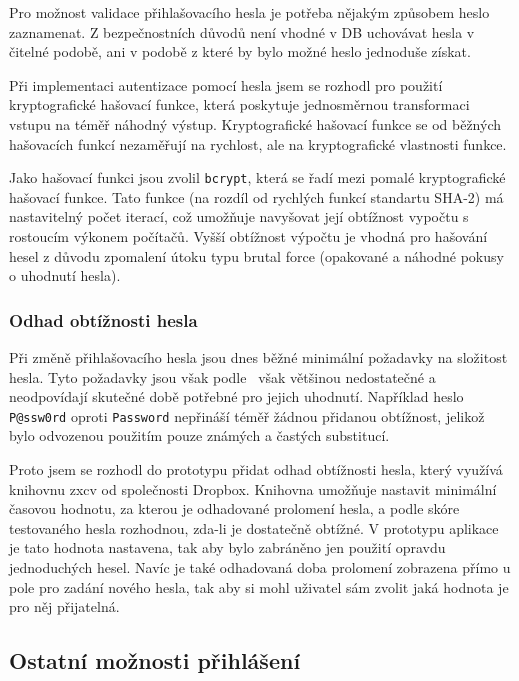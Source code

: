 Pro možnost validace přihlašovacího hesla je potřeba nějakým způsobem heslo zaznamenat.
Z bezpečnostních důvodů není vhodné v DB uchovávat hesla v čitelné podobě, ani v podobě z které by bylo možné heslo jednoduše získat.

Při implementaci autentizace pomocí hesla jsem se rozhodl pro použití kryptografické hašovací funkce, která poskytuje jednosměrnou transformaci vstupu na téměř náhodný výstup.
Kryptografické hašovací funkce se od běžných hašovacích funkcí nezaměřují na rychlost, ale na kryptografické vlastnosti funkce.

Jako hašovací funkci jsou zvolil \texttt{bcrypt}, která se řadí mezi pomalé kryptografické hašovací funkce.
Tato funkce (na rozdíl od rychlých funkcí standartu SHA-2) má nastavitelný počet iterací, což umožňuje navyšovat její obtížnost vypočtu s rostoucím výkonem počítačů.
Vyšší obtížnost výpočtu je vhodná pro hašování hesel z důvodu zpomalení útoku typu brutal force (opakované a náhodné pokusy o uhodnutí hesla).

\subsubsection{Odhad obtížnosti hesla}

Při změně přihlašovacího hesla jsou dnes běžné minimální požadavky na složitost hesla.
Tyto požadavky jsou však podle~\cite{dropbox:zxcv} však většinou nedostatečné a neodpovídají skutečné době potřebné pro jejich uhodnutí.
Například heslo \texttt{P@ssw0rd} oproti \texttt{Password} nepřináší téměř žádnou přidanou obtížnost, jelikož bylo odvozenou použitím pouze známých a častých substitucí.

Proto jsem se rozhodl do prototypu přidat odhad obtížnosti hesla, který využívá knihovnu zxcv od společnosti Dropbox.
Knihovna umožňuje nastavit minimální časovou hodnotu, za kterou je odhadované prolomení hesla, a podle skóre testovaného hesla rozhodnou, zda-li je dostatečně obtížné.
V prototypu aplikace je tato hodnota nastavena, tak aby bylo zabráněno jen použití opravdu jednoduchých hesel.
Navíc je také odhadovaná doba prolomení zobrazena přímo u pole pro zadání nového hesla, tak aby si mohl uživatel sám zvolit jaká hodnota je pro něj přijatelná.

\subsection{Ostatní možnosti přihlášení}\label{subsec:ostatníMožnostiPřihlášení}


